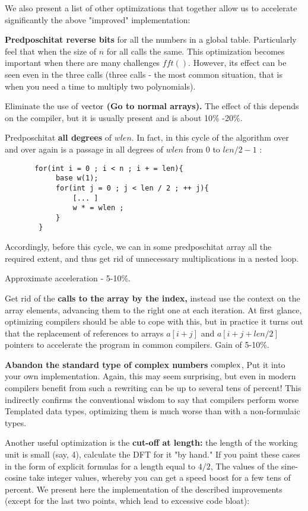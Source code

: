 We also present a list of other optimizations that together allow us to accelerate significantly the above "improved" implementation:

\textbf{Predposchitat reverse bits} for all the numbers in a global table. Particularly feel that when the size of $n$ for all calls the same.
This optimization becomes important when there are many challenges $fft()$. However, its effect can be seen even in the three calls (three calls - the most common situation, that is when you need a time to multiply two polynomials).

Eliminate the use of $\rm vector$ \textbf{(Go to normal arrays).}
The effect of this depends on the compiler, but it is usually present and is about 10\% -20\%.

Predposchitat \textbf{all degrees} of $wlen$. In fact, in this cycle of the algorithm over and over again is a passage in all degrees of $wlen$ from $0$ to $len/2-1$ :
\begin{verbatim}
       for(int i = 0 ; i < n ; i + = len){
            base w(1);
            for(int j = 0 ; j < len / 2 ; ++ j){
                [... ]
                w * = wlen ;
            }
        } 
\end{verbatim}
Accordingly, before this cycle, we can in some predposchitat array all the required extent, and thus get rid of unnecessary multiplications in a nested loop.

Approximate acceleration - 5-10\%.

Get rid of the \textbf{calls to the array by the index,} instead use the context on the array elements, advancing them to the right one at each iteration.
At first glance, optimizing compilers should be able to cope with this, but in practice it turns out that the replacement of references to arrays $a [i + j]$ and $a [i + j + len / 2]$ pointers to accelerate the program in common compilers. Gain of 5-10\%.

\textbf{Abandon the standard type of complex numbers} $\rm complex$, Put it into your own implementation.
Again, this may seem surprising, but even in modern compilers benefit from such a rewriting can be up to several tens of percent! This indirectly confirms the conventional wisdom to say that compilers perform worse Templated data types, optimizing them is much worse than with a non-formulaic types.

Another useful optimization is the \textbf{cut-off at length:} the length of the working unit is small (say, 4), calculate the DFT for it "by hand." If you paint these cases in the form of explicit formulas for a length equal to $4/2$, The values ​​of the sine-cosine take integer values, whereby you can get a speed boost for a few tens of percent.
We present here the implementation of the described improvements (except for the last two points, which lead to excessive code bloat):

